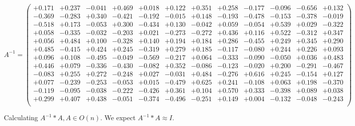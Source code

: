 \documentclass[9pt]{article}
\theoremstyle{plain}
\theoremstyle{definition}
\theoremstyle{remark}
\numberwithin{equation}{section}
\begin{document}
$A^{-1} = \left(
\begin{array}{
cccccccccccc}
+0.171 & +0.237 & -0.041 & +0.469 & +0.018 & +0.122 & +0.351 & +0.258 & -0.177 & -0.096 & -0.656 & +0.132 \\
-0.369 & -0.283 & +0.340 & -0.421 & -0.192 & -0.015 & +0.148 & -0.193 & -0.478 & -0.153 & -0.378 & -0.019 \\
-0.518 & +0.173 & -0.053 & +0.300 & -0.434 & +0.130 & -0.042 & +0.059 & -0.054 & +0.539 & +0.029 & -0.322 \\
+0.058 & -0.335 & -0.032 & -0.203 & +0.021 & -0.273 & -0.272 & +0.436 & +0.116 & +0.522 & -0.312 & +0.347 \\
+0.056 & +0.484 & +0.100 & -0.328 & +0.140 & +0.194 & +0.184 & +0.286 & -0.455 & +0.249 & +0.345 & +0.290 \\
+0.485 & -0.415 & +0.424 & +0.245 & -0.319 & +0.279 & +0.185 & -0.117 & -0.080 & +0.244 & +0.226 & +0.093 \\
+0.096 & +0.108 & -0.495 & -0.049 & -0.569 & -0.217 & +0.064 & -0.333 & -0.090 & -0.050 & +0.036 & +0.483 \\
+0.446 & +0.079 & -0.336 & -0.430 & -0.082 & +0.352 & -0.086 & -0.123 & -0.020 & +0.200 & -0.291 & -0.467 \\
-0.083 & +0.255 & +0.272 & -0.248 & +0.027 & -0.031 & +0.484 & -0.276 & +0.616 & +0.245 & -0.154 & +0.127 \\
+0.077 & -0.239 & -0.253 & -0.053 & +0.015 & -0.479 & +0.625 & +0.241 & -0.108 & +0.063 & +0.198 & -0.370 \\
-0.119 & -0.095 & -0.038 & -0.222 & -0.426 & +0.361 & +0.104 & +0.570 & +0.333 & -0.398 & +0.089 & +0.038 \\
+0.299 & +0.407 & +0.438 & -0.051 & -0.374 & -0.496 & -0.251 & +0.149 & +0.004 & -0.132 & -0.048 & -0.243 \\
\end{array}
\right)$ \newline 

Calculating $A^{-1} *A  ,  A \in O(n)$.   We expect $A^{-1} *A  \approx I$. 
\end{document}
